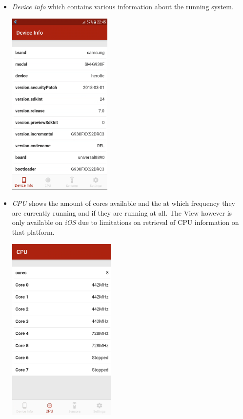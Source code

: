\documentclass{article}
\begin{document}
  \begin{itemize}
    \item \textit{Device info} which contains various information about the running system.

    \begin{center}
      \includegraphics[height=25em]{mobile-device-info}
    \end{center}

    \item \textit{CPU} shows the amount of cores available and the at which frequency they are currently running and if they are running at all. The View however is only available on \textit{iOS} due to limitations on retrieval of CPU information on that platform.

    \begin{center}
      \includegraphics[height=25em]{mobile-cpu}
    \end{center}


\end{itemize}
\end{document}
